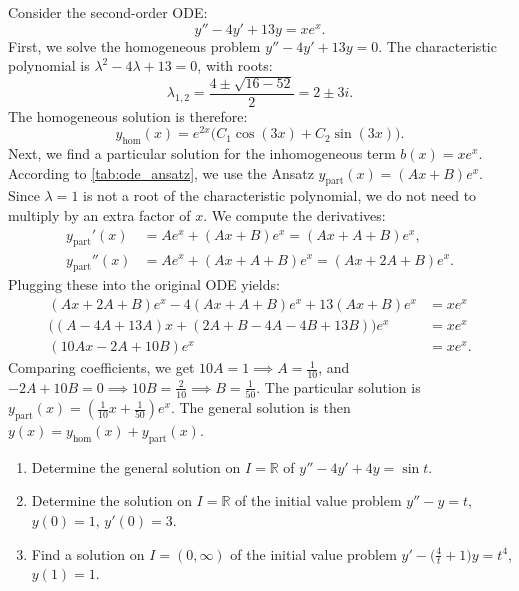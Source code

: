 \begin{example}
\label{ex:ode_inhomogeneous}
Consider the second-order ODE:
\[y'' - 4y' + 13y = x e^x.\]
First, we solve the homogeneous problem $y'' - 4y' + 13y = 0$. The characteristic polynomial is $\lambda^2 - 4\lambda + 13 = 0$, with roots:
\[\lambda_{1,2} = \frac{4 \pm \sqrt{16 - 52}}{2} = 2 \pm 3i.\]
The homogeneous solution is therefore:
\[y_{\text{hom}}(x) = e^{2x} \big(C_1 \cos(3x) + C_2 \sin(3x)\big).\]
Next, we find a particular solution for the inhomogeneous term $b(x) = x e^x$. According to \cref{tab:ode_ansatz}, we use the Ansatz $y_{\text{part}}(x) = (Ax + B)e^x$. Since $\lambda = 1$ is not a root of the characteristic polynomial, we do not need to multiply by an extra factor of $x$. We compute the derivatives:
\begin{align*}
    y_{\text{part}}'(x) &= A e^x + (Ax + B)e^x = (Ax + A + B)e^x, \\
    y_{\text{part}}''(x) &= A e^x + (Ax + A + B)e^x = (Ax + 2A + B)e^x.
\end{align*}
Plugging these into the original ODE yields:
\begin{align*}
    (Ax + 2A + B)e^x - 4(Ax + A + B)e^x + 13(Ax + B)e^x &= x e^x \\
    \big((A - 4A + 13A)x + (2A + B - 4A - 4B + 13B)\big)e^x &= x e^x \\
    (10Ax - 2A + 10B)e^x &= x e^x.
\end{align*}
Comparing coefficients, we get $10A = 1 \implies A = \frac{1}{10}$, and $-2A + 10B = 0 \implies 10B = \frac{2}{10} \implies B = \frac{1}{50}$.
The particular solution is $y_{\text{part}}(x) = \left(\frac{1}{10}x + \frac{1}{50}\right)e^x$. The general solution is then $y(x) = y_{\text{hom}}(x) + y_{\text{part}}(x)$.
\end{example}

\begin{exercise}
\label{ex:three_linear_odes}
\begin{enumerate}[label=\textbf{(\alph*)}]
  \item Determine the general solution on $I=\mathbb{R}$ of $y''-4y'+4y=\sin t$.
  \item Determine the solution on $I=\mathbb{R}$ of the initial value problem
    $y''-y=t$, $y(0)=1$, $y'(0)=3$.
  \item Find a solution on $I=(0,\infty)$ of the initial value problem
    $y'-\big(\tfrac4t+1\big)y=t^4$, $y(1)=1$.
\end{enumerate}
\end{exercise}

